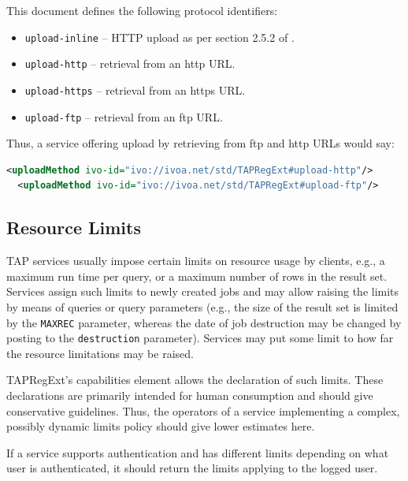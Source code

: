 \documentclass{ivoa}
\begin{document}
This document defines the following protocol identifiers:


\begin{itemize}

\item \texttt{upload-inline} -- HTTP upload as per section 2.5.2 of 
\citep{std:TAP}.{}

\item \texttt{upload-http} -- retrieval from an http URL.{}

\item \texttt{upload-https} -- retrieval from an https URL.{}

\item \texttt{upload-ftp} -- retrieval from an ftp URL.{}

\end{itemize}

Thus, a service offering upload by retrieving from ftp and http URLs
would say:


\begin{lstlisting}[language=XML]
  <uploadMethod ivo-id="ivo://ivoa.net/std/TAPRegExt#upload-http"/>
  <uploadMethod ivo-id="ivo://ivoa.net/std/TAPRegExt#upload-ftp"/>
\end{lstlisting}

\subsection{Resource Limits}

\label{reslimits}

TAP services usually impose certain limits on resource usage by clients,
e.g., a maximum run time per query, or a maximum number of rows in the result
set.  Services assign such limits to newly created jobs and may
allow raising the limits by means of queries or query parameters (e.g., the
size of the result set is limited by the \texttt{MAXREC} parameter, whereas
the date of job destruction may be changed by posting to the
\texttt{destruction} parameter).  Services may put some limit to how
far the resource limitations may be raised.

TAPRegExt's capabilities element allows the declaration of such limits.
These declarations are primarily intended for human consumption and should give
conservative guidelines.  Thus, the operators of a service implementing a
complex, possibly dynamic limits policy should give lower estimates here.

If a service supports authentication and has different
limits depending on what user is authenticated, it should return the
limits applying to the logged user.
\end{document}
